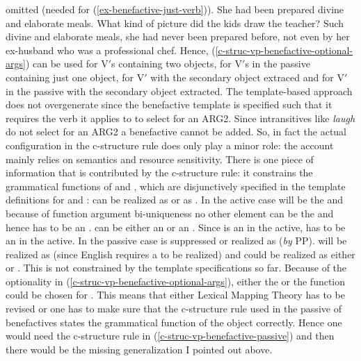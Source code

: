 omitted (needed for (\ref{ex-benefactive-just-verb})). 
\eal
\ex
\label{ex-she-had-been-prepared-a-meal} 
She had been prepared divine and elaborate meals.
\ex
\label{ex-extraction-secondary-object}
What kind of picture did the kids draw the teacher? 
\ex
\label{ex-benefactive-just-verb} 
Such divine and elaborate meals, she had never been prepared before, not even
by her ex-husband who was a professional chef.
\zl
Hence,
(\ref{c-struc-vp-benefactive-optional-args}) can be used for V$'$s containing two objects, for V$'$s
in the passive containing just one object, for V$'$ with the secondary object extraced and for V$'$
in the passive with the secondary object extracted. The template-based approach does not
overgenerate since the benefactive template is specified such that it requires the verb it applies
to to select for an ARG2. Since intransitives like \emph{laugh} do not select for an ARG2 a
benefactive cannot be added. So, in fact the actual configuration in the c-structure rule does only
play a minor role: the account mainly relies on semantics and resource sensitivity. There is one
piece of information that is contributed by the c-structure rule: it constrains the grammatical
functions of \argtwo and \argthree, which are disjunctively specified in the template definitions for \argtwo
and \argthree: \argtwo can be realized as \lfgsubj or as \lfgobj. In the active case \argone will be the \subj and because of function argument bi-uniqueness \citep[]{BATW2016a} no other element can be the \lfgsubj and hence \argtwo has to
be an \lfgobj. \argthree can be either an \lfgobj or an \objtheta. Since \argtwo is an \lfgobj in the active,
\argthree has to be an \objtheta in the active. In the passive case \argone is suppressed or
realized as \obltheta (\emph{by} PP). \argtwo will be realized as \subj (since English requires a \subj to be realized) and \argthree could be realized as either
\lfgobj or \objtheta. This is not constrained by the template specifications so far. Because of the
optionality in (\ref{c-struc-vp-benefactive-optional-args}), either the \lfgobj or the \objtheta
function could be chosen for \argthree. This means that either Lexical Mapping Theory has to be
revised or one has to make sure that the c-structure rule used in the passive of benefactives states the grammatical
function of the object correctly. Hence one would need the c-structure rule in
(\ref{c-struc-vp-benefactive-passive}) and then there would be the missing generalization I pointed
out above.


